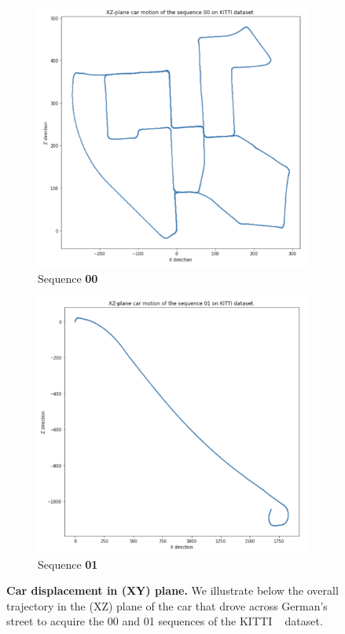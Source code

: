 \begin{figure}[htpb!]
    \centering
    \begin{subfigure}[b]{0.48\linewidth}
      \includegraphics[width=\linewidth]{images/epipolarnvs/XYplaneMotionKITTI.png}
      \caption{Sequence \textbf{00}}
    \end{subfigure}
    \quad %
    \begin{subfigure}[b]{0.48\linewidth}
      \includegraphics[width=\linewidth]{images/epipolarnvs/XYplaneMotionKITTI01.png}
      \caption{Sequence \textbf{01}}
    \end{subfigure}
    \caption{\textbf{Car displacement in (XY) plane.} We illustrate below the overall trajectory in the (XZ) plane of the car that drove across German's street to acquire the 00 and 01 sequences of the KITTI ~\citep{geiger2012we} dataset.}
    \label{fig:test}
  \end{figure}

